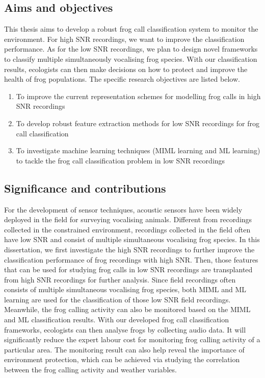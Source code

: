 \subsection{Aims and objectives}
This thesis aims to develop a robust frog call classification system to monitor the environment. For high SNR recordings, we want to improve the classification performance. As for the low SNR recordings, we plan to design novel frameworks to classify multiple simultaneously vocalising frog species. With our classification results, ecologists can then make decisions on how to protect and improve the health of frog populations. The specific research objectives are listed below.


\begin{enumerate}

\item	To improve the current representation schemes for modelling frog calls in high SNR recordings

\item 	To develop robust feature extraction methods for low SNR recordings for frog call classification

\item   To investigate machine learning techniques (MIML learning and ML learning) to tackle the frog call classification problem in low SNR recordings

\end{enumerate}
 
 
 
\subsection{Significance and contributions}
For the development of sensor techniques, acoustic sensors have been widely deployed in the field for surveying vocalising animals. Different from recordings collected in the constrained environment, recordings collected in the field often have low SNR and consist of multiple simultaneous vocalising frog species. In this dissertation, we first investigate the high SNR recordings to further improve the classification performance of frog recordings with high SNR. 
Then, those features that can be used for studying frog calls in low SNR recordings are transplanted from high SNR recordings for further analysis.
Since field recordings often consists of multiple simultaneous vocalising frog species, both MIML and ML learning are used for the classification of those low SNR field recordings. Meanwhile, the frog calling activity can also be monitored based on the MIML and ML classification results.
With our developed frog call classification frameworks, ecologists can then analyse frogs by collecting audio data. It will significantly reduce the expert labour cost for monitoring frog calling activity of a particular area. The monitoring result can also help reveal the importance of environment protection, which can be achieved via studying the correlation between the frog calling activity and weather variables. 

